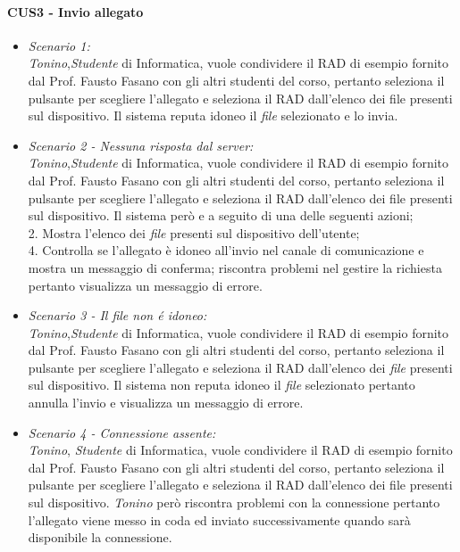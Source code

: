 \paragraph{CUS3 - Invio allegato\\}
\begin{itemize}

\item \textit{Scenario 1:\\}
\textit{Tonino},\textit{Studente} di Informatica, vuole condividere il RAD di esempio fornito dal Prof. Fausto Fasano con gli altri studenti del corso, pertanto seleziona il pulsante per scegliere l’allegato e seleziona il RAD dall’elenco dei file presenti sul dispositivo. Il sistema reputa idoneo il \textit{file} selezionato e lo invia.\\

\item \textit{Scenario 2 - Nessuna risposta dal server:\\}
\textit{Tonino},\textit{Studente} di Informatica, vuole condividere il RAD di esempio fornito dal Prof. Fausto Fasano con gli altri studenti del corso, pertanto seleziona il pulsante per scegliere l’allegato e seleziona il RAD dall’elenco dei file presenti sul dispositivo. Il sistema però e a seguito di una delle seguenti azioni;\\
2. Mostra l’elenco dei \textit{file} presenti sul dispositivo dell’utente;\\
4. Controlla se l’allegato è idoneo all’invio nel canale di comunicazione e mostra un messaggio di conferma;
riscontra problemi nel gestire la richiesta pertanto visualizza un messaggio di errore.\\

\item \textit{Scenario 3 - Il file non é idoneo:\\}
\textit{Tonino},\textit{Studente} di Informatica, vuole condividere il RAD di esempio fornito dal Prof. Fausto Fasano con gli altri studenti del corso, pertanto seleziona il pulsante per scegliere l’allegato e seleziona il RAD dall’elenco dei \textit{file} presenti sul dispositivo. Il sistema non reputa idoneo il \textit{file} selezionato pertanto annulla l’invio e visualizza un messaggio di errore.\\

\item \textit{Scenario 4 - Connessione assente:\\}
\textit{Tonino}, \textit{Studente} di Informatica, vuole condividere il RAD di esempio fornito dal Prof. Fausto Fasano con gli altri studenti del corso, pertanto seleziona il pulsante per scegliere l’allegato e seleziona il RAD dall’elenco dei file presenti sul dispositivo. \textit{Tonino} però riscontra problemi con la connessione pertanto l’allegato viene messo in coda ed inviato successivamente quando sarà disponibile la connessione.
\end{itemize}

